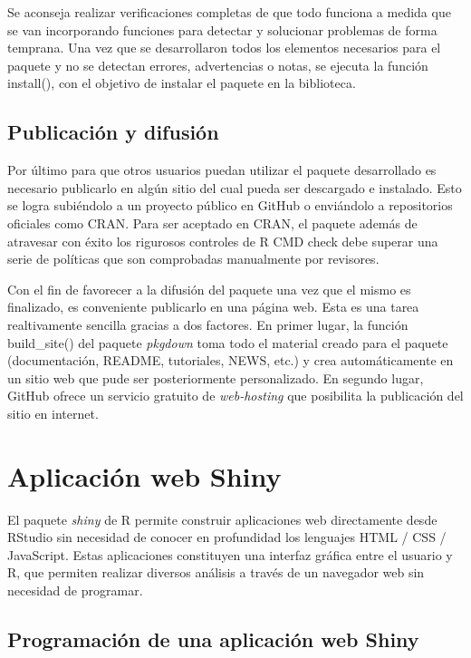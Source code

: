 Se aconseja realizar verificaciones completas de que todo funciona a medida que se van incorporando funciones para detectar y solucionar problemas de forma temprana. Una vez que se desarrollaron todos los elementos necesarios para el paquete y no se detectan errores, advertencias o notas, se ejecuta la función \textcolor{fandango}{install()}, con el objetivo de instalar el paquete en la biblioteca.


\subsection{Publicación y difusión}

Por último para que otros usuarios puedan utilizar el paquete desarrollado es necesario publicarlo en algún sitio del cual pueda ser descargado e instalado. Esto se logra subiéndolo a un proyecto público en GitHub o enviándolo a repositorios oficiales como CRAN. Para ser aceptado en CRAN, el paquete además de atravesar con éxito los rigurosos controles de R CMD check debe superar una serie de políticas que son comprobadas manualmente por revisores. 

Con el fin de favorecer a la difusión del paquete una vez que el mismo es finalizado, es conveniente publicarlo en una página web. Esta es una tarea realtivamente sencilla gracias a dos factores. En primer lugar, la función \textcolor{fandango}{build\_site()} del paquete \emph{pkgdown} \citep{HadleyHesselberth2020} toma todo el material creado para el paquete (documentación, README, tutoriales, NEWS, etc.) y crea automáticamente en un sitio web que pude ser posteriormente personalizado. En segundo lugar, GitHub ofrece un servicio gratuito de \emph{web-hosting} que posibilita la publicación del sitio en internet.

\section{Aplicación web Shiny}

El paquete \emph{shiny} \citep{Changetal2020} de R permite construir aplicaciones web directamente desde RStudio sin necesidad de conocer en profundidad los lenguajes HTML / CSS / JavaScript. Estas aplicaciones constituyen una interfaz gráfica entre el usuario y R, que permiten realizar diversos análisis a través de un navegador web sin necesidad de programar.


\subsection{Programación de una aplicación web Shiny}

